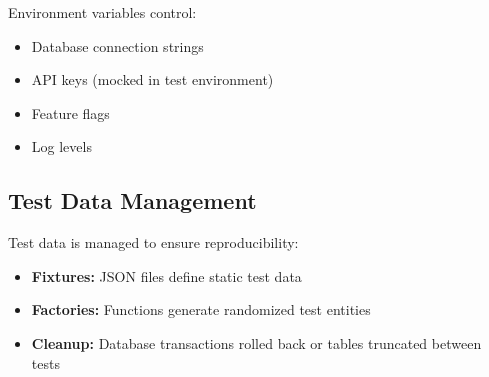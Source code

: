 Environment variables control:
\begin{itemize}
    \item Database connection strings
    \item API keys (mocked in test environment)
    \item Feature flags
    \item Log levels
\end{itemize}

\subsection{Test Data Management}
\label{subsec:test_data_management}

Test data is managed to ensure reproducibility:
\begin{itemize}
    \item \textbf{Fixtures:} JSON files define static test data
    \item \textbf{Factories:} Functions generate randomized test entities
    \item \textbf{Cleanup:} Database transactions rolled back or tables truncated between tests
\end{itemize}
